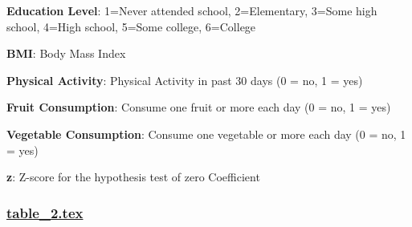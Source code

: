 \documentclass[11pt]{article}
\begin{document}
\begin{codeoutput}
\begin{table}[h]
\begin{threeparttable}
\begin{tablenotes}
\item \textbf{Education Level}: 1=Never attended school, 2=Elementary, 3=Some high school, 4=High school, 5=Some college, 6=College
\item \textbf{BMI}: Body Mass Index
\item \textbf{Physical Activity}: Physical Activity in past 30 days (0 = no, 1 = yes)
\item \textbf{Fruit Consumption}: Consume one fruit or more each day (0 = no, 1 = yes)
\item \textbf{Vegetable Consumption}: Consume one vegetable or more each day (0 = no, 1 = yes)
\item \textbf{z}: Z-score for the hypothesis test of zero Coefficient
\end{tablenotes}
\end{threeparttable}
\end{table}

\end{codeoutput}

\subsubsection*{\hyperlink{code-LaTeX Table Design-table-2-tex}{table\_2.tex}}
\end{document}
